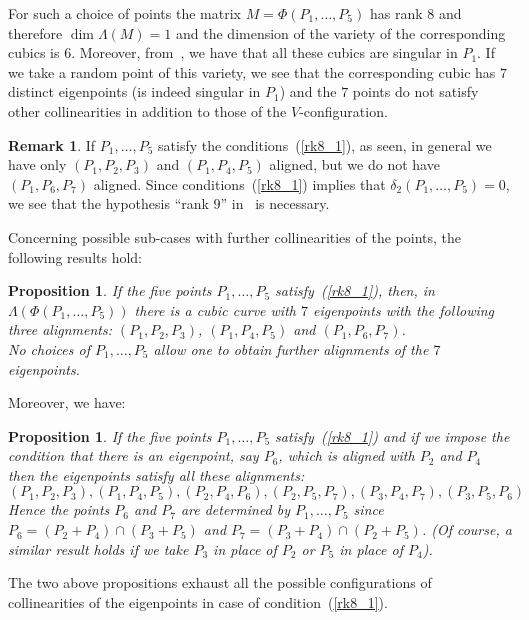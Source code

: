 \documentclass{amsart}
\theoremstyle{plain}
\newtheorem{prop}[lemma]{Proposition}
\theoremstyle{definition}
\newtheorem{rmk}[lemma]{Remark}
\begin{document}
For such a choice
of points the matrix $M = \Phi(P_1, \dots, P_5)$ has rank $8$
and therefore $\dim \Lambda(M) = 1$ and the dimension of the variety
of the corresponding cubics is $6$.
Moreover, from~, we have that all these cubics
are singular in $P_1$.
If we take a random point of this variety, we see that the corresponding
cubic has $7$ distinct eigenpoints (is indeed singular in $P_1$) and the
$7$ points do not satisfy other collinearities in addition to those of the
$V$-configuration.

\begin{rmk}
\label{rmk:particular_cases}
If $P_1, \dots, P_5$ satisfy the conditions~(\ref{rk8_1}), as seen,
in general we have only $(P_1, P_2, P_3)$ and $(P_1, P_4, P_5)$ aligned, but
we do not have $(P_1, P_6, P_7)$ aligned. Since conditions~(\ref{rk8_1})
implies that $\delta_2(P_1, \dots, P_5) = 0$, we see
that the hypothesis ``rank $9$''
in~ is necessary.
\end{rmk}

Concerning possible sub-cases with further collinearities of the points,
the following results hold:
\begin{prop}
\label{three_d_three_alignments}
If the five points $P_1, \dots, P_5$ satisfy~(\ref{rk8_1}),
then, in $\Lambda(\Phi(P_1, \dotsc, P_5))$ there is
a cubic curve with $7$ eigenpoints with the following three alignments:
$(P_1, P_2, P_3)$, $(P_1, P_4, P_5)$ and $(P_1, P_6, P_7)$. \\
No choices of $P_1, \dots, P_5$ allow one to obtain further alignments of the
$7$ eigenpoints.
\end{prop}
Moreover, we have:
\begin{prop}
\label{prop:d2_6allin}
If the five points $P_1, \dots, P_5$ satisfy~(\ref{rk8_1})
and if we impose the condition that there is an eigenpoint, say $P_6$,
which is aligned with $P_2$ and $P_4$ then the eigenpoints satisfy all these
alignments:
\[
(P_1, P_2, P_3), (P_1, P_4, P_5), (P_2, P_4, P_6), (P_2, P_5, P_7),
(P_3, P_4, P_7), (P_3, P_5, P_6)
\]
Hence the points $P_6$ and $P_7$ are determined by $P_1, \dots, P_5$
since
$P_6 = (P_2+P_4) \cap (P_3+P_5)$
and $P_7 = (P_3+P_4) \cap (P_2+P_5)$.
(Of course, a similar result holds if we take $P_3$ in place of $P_2$ or $P_5$
in place of $P_4$).
\end{prop}
The two above propositions exhaust all the possible configurations
of collinearities of the eigenpoints in case of condition~(\ref{rk8_1}).
\end{document}
